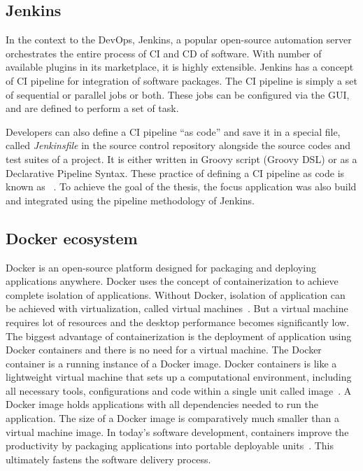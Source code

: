 
\subsection{Jenkins}

In the context to the DevOps, Jenkins, a popular open-source automation server orchestrates the entire process of \ac{CI} and \ac{CD} of software. With number of available plugins in its marketplace, it is highly extensible. Jenkins has a concept of \ac{CI} pipeline for integration of software packages. The CI pipeline is simply a set of sequential or parallel jobs or both. These jobs can be configured via the GUI, and are defined to perform a set of task. 

Developers can also define a CI pipeline \enquote{as code} and save it in a special file, called \emph{Jenkinsfile} in the source control repository alongside the source codes and test suites of a project. It is either written in Groovy script (Groovy \ac{DSL}) or as a Declarative Pipeline Syntax. These practice of defining a CI pipeline as code is known as ~\parencite{pathania2017pro}. To achieve the goal of the thesis, the focus application was also build and integrated using the pipeline methodology of Jenkins.

\subsection{Docker ecosystem}

Docker is an open-source platform designed for packaging and deploying applications anywhere. Docker uses the concept of containerization to achieve complete isolation of applications. Without Docker, isolation of application can be achieved with virtualization, called virtual machines~\parencite{leszko2017continuous}. But a virtual machine requires lot of resources and the desktop performance becomes significantly low. The biggest advantage of containerization is the deployment of application using Docker containers and there is no need for a virtual machine. The Docker container is a running instance of a Docker image. Docker containers is like a lightweight virtual machine that sets up a computational environment, including all necessary tools, configurations and code within a single unit called image~\parencite{cito2016using}. A Docker image holds applications with all dependencies needed to run the application. The size of a Docker image is comparatively much smaller than a virtual machine image.  In today’s software development, containers improve the productivity by packaging applications into portable deployable units~\parencite{benedicic2019sarus}. This ultimately fastens the software delivery process.

